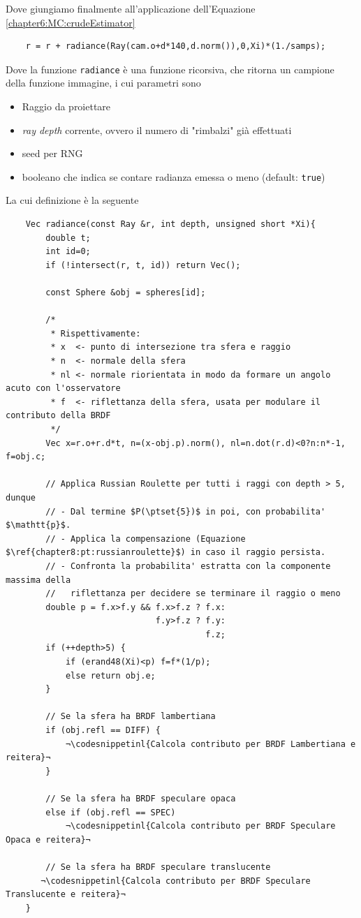 Dove giungiamo finalmente all'applicazione dell'Equazione \ref{chapter6:MC:crudeEstimator}
\begin{verbatim}
	r = r + radiance(Ray(cam.o+d*140,d.norm()),0,Xi)*(1./samps); 
\end{verbatim}
Dove la funzione \texttt{radiance} \`e una funzione ricorsiva, che ritorna un campione della funzione immagine, i cui parametri sono
\begin{itemize}[topsep=0pt,noitemsep]
	\item Raggio da proiettare
	\item \textit{ray depth} corrente, ovvero il numero di "rimbalzi" gi\`a effettuati
	\item seed per RNG
	\item booleano che indica se contare radianza emessa o meno (default: \texttt{true})
\end{itemize}
La cui definizione \`e la seguente
\begin{verbatim}
	Vec radiance(const Ray &r, int depth, unsigned short *Xi){ 
		double t;
		int id=0;
		if (!intersect(r, t, id)) return Vec();

		const Sphere &obj = spheres[id]; 

		/*
		 * Rispettivamente:
		 * x  <- punto di intersezione tra sfera e raggio
		 * n  <- normale della sfera
		 * nl <- normale riorientata in modo da formare un angolo acuto con l'osservatore
		 * f  <- riflettanza della sfera, usata per modulare il contributo della BRDF
		 */
		Vec x=r.o+r.d*t, n=(x-obj.p).norm(), nl=n.dot(r.d)<0?n:n*-1, f=obj.c;

		// Applica Russian Roulette per tutti i raggi con depth > 5, dunque 
		// - Dal termine $P(\ptset{5})$ in poi, con probabilita' $\mathtt{p}$.
		// - Applica la compensazione (Equazione $\ref{chapter8:pt:russianroulette}$) in caso il raggio persista.
		// - Confronta la probabilita' estratta con la componente massima della 
		//   riflettanza per decidere se terminare il raggio o meno
		double p = f.x>f.y && f.x>f.z ? f.x:
		                      f.y>f.z ? f.y:
		                                f.z;
		if (++depth>5) {
			if (erand48(Xi)<p) f=f*(1/p); 
			else return obj.e;
		}

		// Se la sfera ha BRDF lambertiana
		if (obj.refl == DIFF) {
			¬\codesnippetinl{Calcola contributo per BRDF Lambertiana e reitera}¬
		} 

		// Se la sfera ha BRDF speculare opaca
		else if (obj.refl == SPEC)
			¬\codesnippetinl{Calcola contributo per BRDF Speculare Opaca e reitera}¬

		// Se la sfera ha BRDF speculare translucente
	   ¬\codesnippetinl{Calcola contributo per BRDF Speculare Translucente e reitera}¬
	}
\end{verbatim}
